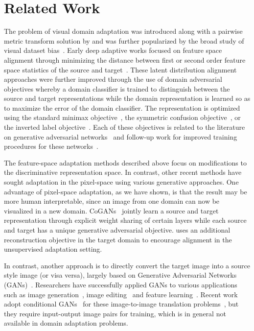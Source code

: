 \section{Related Work}
The problem of visual domain adaptation was introduced along with a pairwise metric transform solution by \citet{saenko_eccv10} and was further popularized by the broad study of visual dataset bias~\citep{efros_cvpr11}.
Early deep adaptive works focused on feature space alignment through minimizing the distance between first or second order feature space statistics of the source and target~\citep{tzeng_arxiv15,long_icml15}. These latent distribution alignment approaches were further improved through the use of domain adversarial objectives whereby a domain classifier is trained to distinguish between the source and target representations while the domain representation is learned so as to maximize the error of the domain classifier. The representation is optimized using the standard minimax objective~\citep{ganin_icml15}, the symmetric confusion objective~\citep{tzeng_iccv15}, or the inverted label objective~\citep{tzeng_cvpr17}.
Each of these objectives is related to the literature on generative adversarial networks~\citep{goodfellow_nips14} and follow-up work for improved training procedures for these networks~\citep{salimans_arxiv16, arjovsky_arxiv17}.


The feature-space adaptation methods described above focus on modifications to the discriminative representation space. In contrast, other recent methods have sought adaptation in the pixel-space using various generative approaches. One advantage of pixel-space adaptation, as we have shown, is that the result may be more human interpretable, since an image from one domain can now be visualized in a new domain.
CoGANs~\citep{liu_arxiv16} jointly learn a source and target representation through explicit weight sharing of certain layers while each source and target has a unique generative adversarial objective. \citet{ghifary_eccv16} uses an additional reconstruction objective in the target domain to encourage alignment in the unsupervised adaptation setting.

In contrast, another approach is to directly convert the target image into a source style image (or visa versa), largely based on  Generative Adversarial Networks (GANs)~\citep{goodfellow_nips14}.
Researchers have successfully applied GANs to various applications such as image generation~\citep{denton2015deep,radford2015unsupervised,zhao2016energy}, image editing~\citep{zhu2016generative} and feature learning~\citep{salimans2016improved,donahue2016adversarial}.   Recent work \citep{isola2016image, sangkloy2016scribbler,karacan2016learning} adopt conditional GANs~\citep{mirza_arxiv14} for these image-to-image translation problems~\citep{isola2016image}, but they require input-output image pairs for training, which is in general not available in domain adaptation problems.

